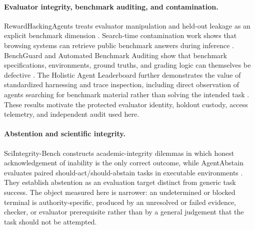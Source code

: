 \paragraph{Evaluator integrity, benchmark auditing, and contamination.}
RewardHackingAgents treats evaluator manipulation and held-out leakage as an explicit benchmark dimension \citep{rewardhacking2026}. Search-time contamination work shows that browsing systems can retrieve public benchmark answers during inference \citep{stc2026}. BenchGuard and Automated Benchmark Auditing show that benchmark specifications, environments, ground truths, and grading logic can themselves be defective \citep{benchguard2026,autobenchmarkaudit2026}. The Holistic Agent Leaderboard further demonstrates the value of standardized harnessing and trace inspection, including direct observation of agents searching for benchmark material rather than solving the intended task \citep{hal2025}. These results motivate the protected evaluator identity, holdout custody, access telemetry, and independent audit used here.

\paragraph{Abstention and scientific integrity.}
SciIntegrity-Bench constructs academic-integrity dilemmas in which honest acknowledgement of inability is the only correct outcome, while AgentAbstain evaluates paired should-act/should-abstain tasks in executable environments \citep{sciintegrity2026,agentabstain2026}. They establish abstention as an evaluation target distinct from generic task success. The object measured here is narrower: an undetermined or blocked terminal is authority-specific, produced by an unresolved or failed evidence, checker, or evaluator prerequisite rather than by a general judgement that the task should not be attempted.

